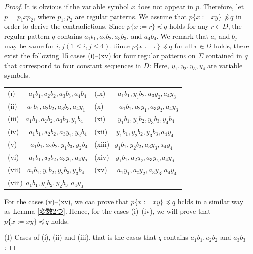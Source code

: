 \begin{proof}
It is obvious if the variable symbol $x$ does not appear in $p$.
Therefore, let $p=p_{1}xp_{2}$, where $p_{1}, p_{2}$ are regular patterns.
We assume that $p \{ x := xy \} \not \preceq q$ in order to derive the contradictions.
Since $p \{ x := r \} \preceq q$ holds for any $r \in D$,
the regular pattern $q$ contains $a_{1}b_{1}, a_{2}b_{2}, a_{3}b_{3}$, and $a_{4}b_{4}$.
We remark that $a_i$ and $b_j$ may be same for $i,j (1\le i,j\le 4)$.
Since $p \{ x := r \} \preceq q$ for all $r \in D$ holds, 
there exist the following 15 cases (i)--(xv) for four regular patterns on $\Sigma$ contained in $q$ that correspond to four constant sequences in $D$:
Here, $y_1,y_2,y_3,y_4$ are variable symbols.

\medskip  

\noindent
\begin{tabular}{ll}
(i)~~~~$a_{1}b_{1}, a_{2}b_{2}, a_{3}b_{3}, a_{4}b_{4}$  & (ix)~~~ $a_{1}b_{1}, y_{1}b_{2}, a_{3}y_{2}, a_{4}y_{3}$ \\
(ii)~~~$a_{1}b_{1}, a_{2}b_{2}, a_{3}b_{3}, a_{4}y_{1}$  & (x)~~~~ $a_{1}b_{1}, a_{2}y_{1}, a_{3}y_{2}, a_{4}y_{3}$ \\
(iii)~~$a_{1}b_{1}, a_{2}b_{2}, a_{3}b_{3}, y_{1}b_{4}$ & (xi)~~~ $y_{1}b_{1}, y_{2}b_{2}, y_{3}b_{3}, y_{4}b_{4}$ \\
(iv)~~~$a_{1}b_{1}, a_{2}b_{2}, a_{3}y_{1}, y_{2}b_{4}$  & (xii)~~ $y_{1}b_{1}, y_{2}b_{2}, y_{3}b_{3}, a_{4}y_{4}$ \\
(v)~~~~$a_{1}b_{1}, a_{2}b_{2}, y_{1}b_{3}, y_{2}b_{4}$    & (xiii)~ $y_{1}b_{1}, y_{2}b_{2}, a_{3}y_{3}, a_{4}y_{4}$ \\
(vi)~~~$a_{1}b_{1}, a_{2}b_{2}, a_{3}y_{1}, a_{4}y_{2}$   & (xiv)~~$y_{1}b_{1}, a_{2}y_{2}, a_{3}y_{3}, a_{4}y_{4}$ \\
(vii)~~$a_{1}b_{1}, y_{1}b_{2}, y_{2}b_{3}, y_{3}b_{4}$  & (xv)~~~$a_{1}y_{1}, a_{2}y_{2}, a_{3}y_{3}, a_{4}y_{4}$ \\
(viii)~$a_{1}b_{1}, y_{1}b_{2}, y_{2}b_{3}, a_{4}y_{3}$ &        %
\end{tabular}
\medskip

\noindent
For the cases (v)--(xv), we can prove that $p \{ x := xy \} \preceq q$ holds in a similar way as Lemma \ref{変数2つ}.
Hence, for the cases (i)--(iv), we will prove that $p \{ x := xy \} \preceq q$ holds.

\smallskip
\noindent
(I) Cases of (i), (ii) and (iii), that is the cases that $q$ contains $a_{1}b_{1}, a_{2}b_{2}$ and $a_{3}b_{3}$:


\end{proof}

